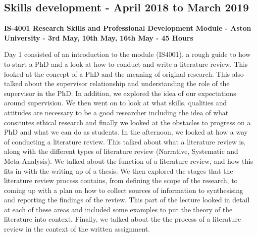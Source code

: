 \documentclass{article}
\begin{document}
	\subsection{Skills development - April 2018 to March 2019}
	\textbf{IS-4001 Research Skills and Professional Development Module - Aston University - 3rd May, 10th May, 16th May - 45 Hours} \newline
	\par
	Day 1 consisted of an introduction to the module (IS4001), a rough guide to how to start a PhD and a look at how to conduct and write a literature review. This looked at the concept of a PhD and the meaning of original research. This also talked about the supervisor relationship and understanding the role of the supervisor in the PhD. In addition, we explored the idea of our expectations around supervision. We then went on to look at what skills, qualities and attitudes are necessary to be a good researcher including the idea of what consitutes ethical research and finally we looked at the obstacles to progress on a PhD and what we can do as students. In the afternoon, we looked at how a way of conducting a literature review. This talked about what a literature review is, along with the different types of literature review (Narrative, Systematic and Meta-Analysis). We talked about the function of a literature review, and how this fits in with the writing up of a thesis. We then explored the stages that the literature review process contains, from defining the scope of the research, to coming up with a plan on how to collect sources of information to synthesising and reporting the findings of the review. This part of the lecture looked in detail at each of these areas and included some examples to put the theory of the literature into context. Finally, we talked about the the process of a literature review in the context of the written assignment. 
	\newline
	\par
\end{document}
